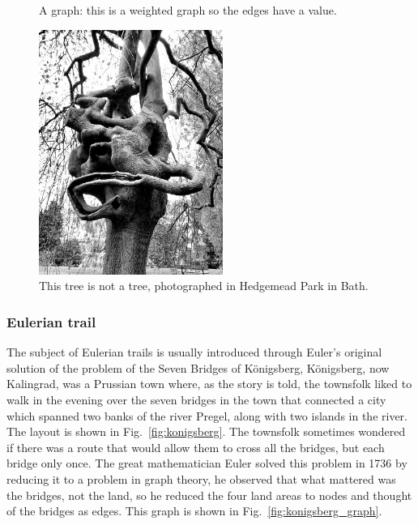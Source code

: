 \documentclass[11pt,a4paper]{scrartcl}
\begin{document}
\begin{figure}
\begin{center}
\end{center}
\caption{A graph: this is a weighted graph so the edges have a value. \label{fig:wei_graph}}
\end{figure}

  

\begin{figure}
\begin{center}
\includegraphics[width=6cm]{not_a_tree_bw.jpg}
\end{center}
\caption{This tree is not a tree, photographed in Hedgemead Park in Bath.\label{fig:not_a_tree}}
\end{figure}

\subsubsection*{Eulerian trail}

The subject of Eulerian trails is usually introduced through Euler's
original solution of the problem of the Seven Bridges of K\"onigsberg,
K\"{o}nigsberg, now Kalingrad, was a Prussian town where, as the story
is told, the townsfolk liked to walk in the evening over the seven
bridges in the town that connected a city which spanned two banks of
the river Pregel, along with two islands in the river. The layout is
shown in Fig.~\ref{fig:konigsberg}. The townsfolk sometimes wondered
if there was a route that would allow them to cross all the bridges,
but each bridge only once. The great mathematician Euler solved this
problem in 1736 by reducing it to a problem in graph theory, he
observed that what mattered was the bridges, not the land, so he
reduced the four land areas to nodes and thought of the bridges as
edges. This graph is shown in Fig.~\ref{fig:konigsberg_graph}.
\end{document}
